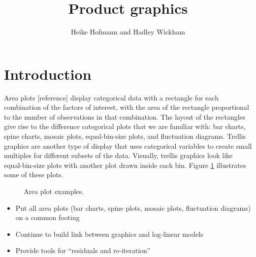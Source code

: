 \documentclass[letterpaper,oneside]{scrartcl}
\title{Product graphics}
\author{Heike Hofmann and Hadley Wickham}
\begin{document}
\maketitle
  
\section{Introduction}

% 



Area plots [reference] display categorical data with a rectangle for each combination of the factors of interest, with the area of the rectangle proportional to the number of observations in that combination. The layout of the rectangles give rise to the difference categorical plots that we are familiar with: bar charts, spine charts, mosaic plots, equal-bin-size plots, and fluctuation diagrams. Trellis graphics are another type of display that uses categorical variables to create small multiples for different subsets of the data. Visually, trellis graphics look like equal-bin-size plots with another plot drawn inside each bin. Figure \ref{fig:cat-examples} illustrates some of these plots.

\begin{figure}[htbp]
  \begin{center}
  \end{center}
  \caption{Area plot examples.}
  \label{fig:cat-examples}
\end{figure}


\begin{itemize}
  \item Put all area plots (bar charts, spine plots, mosaic plots, fluctuation diagrams) on a common footing
  \item Continue to build link between graphics and log-linear models
  \item Provide tools for ``residuals and re-iteration''
\end{itemize}  
\end{document}
